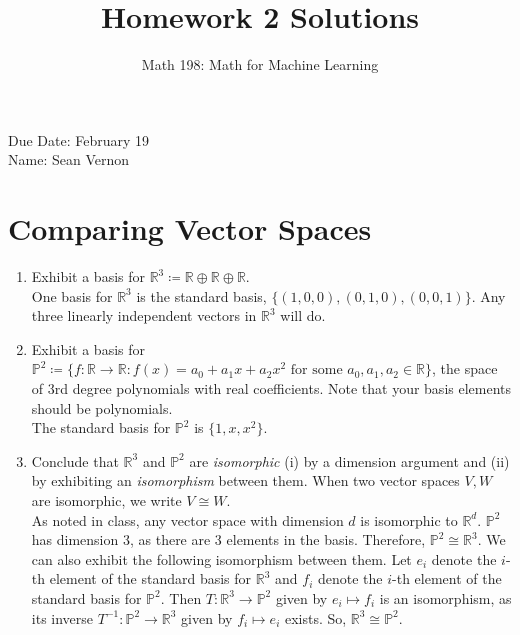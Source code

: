 \documentclass{article}
\title{Homework 2 Solutions}
\author{Math 198: Math for Machine Learning}
\date{}
\begin{document}
\maketitle

\noindent
Due Date: February 19 \\
Name: Sean Vernon

\section{Comparing Vector Spaces}
\begin{enumerate}[label=\arabic*.]
	\item Exhibit a basis for $\mathbb{R}^3 \coloneqq \mathbb{R} \oplus \mathbb{R} \oplus \mathbb{R}$. \\
	{\color{blue} One basis for $\mathbb{R}^3$ is the standard basis, $\{(1, 0, 0), (0, 1, 0), (0, 0, 1)\}$. Any three linearly independent vectors in $\mathbb{R}^3$ will do.}
	\item Exhibit a basis for $\mathbb{P}^2 \coloneqq \{f: \mathbb{R} \to \mathbb{R} : f(x) = a_0 + a_1x + a_2x^2 \text{ for some } a_0,a_1,a_2 \in \mathbb{R} \}$, the space of 3rd degree polynomials with real coefficients. Note that your basis elements should be polynomials. \\
	{\color{blue} The standard basis for $\mathbb{P}^2$ is $\{1, x, x^2\}$.}
	\item Conclude that $\mathbb{R}^3$ and $\mathbb{P}^2$ are \textit{isomorphic} (i) by a dimension argument and (ii) by exhibiting an \textit{isomorphism} between them. When two vector spaces $V,W$ are isomorphic, we write $V \cong W$. \\
	{\color{blue} As noted in class, any vector space with dimension $d$ is isomorphic to $\mathbb{R}^d$. $\mathbb{P}^2$ has dimension 3, as there are 3 elements in the basis. Therefore, $\mathbb{P}^2 \cong \mathbb{R}^3$. We can also exhibit the following isomorphism between them. Let $e_i$ denote the $i$-th element of the standard basis for $\mathbb{R}^3$ and $f_i$ denote the $i$-th element of the standard basis for $\mathbb{P}^2$. Then $T: \mathbb{R}^3 \rightarrow \mathbb{P}^2$ given by $e_i \mapsto f_i$ is an isomorphism, as its inverse $T^{-1}: \mathbb{P}^2 \rightarrow \mathbb{R}^3$ given by $f_i \mapsto e_i$ exists. So, $\mathbb{R}^3 \cong \mathbb{P}^2$.}
\end{enumerate}
\end{document}
